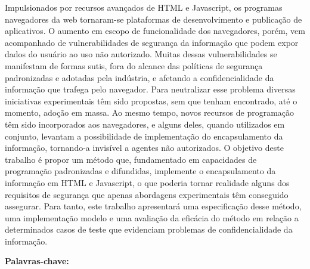 \newpage
\begin{resumo}
\normalsize

Impulsionados por recursos avançados de HTML e Javascript, os programas navegadores da web tornaram-se plataformas de desenvolvimento e publicação de aplicativos. O aumento em escopo de funcionalidade dos navegadores, porém, vem acompanhado de vulnerabilidades de segurança da informação que podem expor dados do usuário ao uso não autorizado. Muitas dessas vulnerabilidades se manifestam de formas sutis, fora do alcance das políticas de segurança padronizadas e adotadas pela indústria, e afetando a confidencialidade da informação que trafega pelo navegador. Para neutralizar esse problema diversas iniciativas experimentais têm sido propostas, sem que tenham encontrado, até o momento, adoção em massa. Ao mesmo tempo, novos recursos de programação têm sido incorporados aos navegadores, e alguns deles, quando utilizados em conjunto, levantam a possibilidade de implementação do encapsulamento da informação, tornando-a invisível a agentes não autorizados. O objetivo deste trabalho é propor um método que, fundamentado em capacidades de programação padronizadas e difundidas, implemente o encapsulamento da informação em HTML e Javascript, o que poderia tornar realidade alguns dos requisitos de segurança que apenas abordagens experimentais têm conseguido assegurar. Para tanto, este trabalho apresentará uma especificação desse método, uma implementação modelo e uma avaliação da eficácia do método em relação a determinados casos de teste que evidenciam problemas de confidencialidade da informação.

\vspace{\onelineskip}

\noindent
\textbf{Palavras-chave:} \imprimirpalavraschave
\end{resumo}

